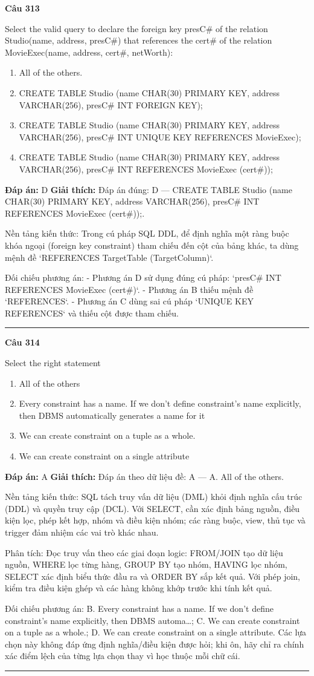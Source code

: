 \documentclass[11pt,a4paper]{article}
\newenvironment{question}[1]{%
  \par\vspace{1em}\noindent\textbf{\large Câu #1}\par\vspace{0.4em}
}{%
  \par\vspace{1em}\hrule\vspace{0.6em}
}
\newenvironment{choices}{%
  \begin{enumerate}[label=\textbf{\Alph*.},leftmargin=2.2em,itemsep=2pt,topsep=3pt]
}{%
  \end{enumerate}
}
\newcommand{\choice}{\item}
\begin{document}
\begin{question}{313}
Select the valid query to declare the foreign key presC# of the relation Studio(name, address, presC#) that references the cert# of the relation MovieExec(name, address, cert#, netWorth):
\begin{choices}
\choice All of the others.
\choice CREATE TABLE Studio (name CHAR(30) PRIMARY KEY, address VARCHAR(256), presC# INT FOREIGN KEY);
\choice CREATE TABLE Studio (name CHAR(30) PRIMARY KEY, address VARCHAR(256), presC# INT UNIQUE KEY REFERENCES MovieExec);
\choice CREATE TABLE Studio (name CHAR(30) PRIMARY KEY, address VARCHAR(256), presC# INT REFERENCES MovieExec (cert#));
\end{choices}
\textbf{Đáp án:} D
\textbf{Giải thích:} Đáp án đúng: D — CREATE TABLE Studio (name CHAR(30) PRIMARY KEY, address VARCHAR(256), presC# INT REFERENCES MovieExec (cert#));.

Nền tảng kiến thức: Trong cú pháp SQL DDL, để định nghĩa một ràng buộc khóa ngoại (foreign key constraint) tham chiếu đến cột của bảng khác, ta dùng mệnh đề `REFERENCES TargetTable (TargetColumn)`.

Đối chiếu phương án:
- Phương án D sử dụng đúng cú pháp: `presC# INT REFERENCES MovieExec (cert#)`.
- Phương án B thiếu mệnh đề `REFERENCES`.
- Phương án C dùng sai cú pháp `UNIQUE KEY REFERENCES` và thiếu cột được tham chiếu.
\end{question}

\begin{question}{314}
Select the right statement
\begin{choices}
\choice All of the others
\choice Every constraint has a name. If we don't define constraint's name explicitly, then DBMS automatically generates a name for it
\choice We can create constraint on a tuple as a whole.
\choice We can create constraint on a single attribute
\end{choices}
\textbf{Đáp án:} A
\textbf{Giải thích:} Đáp án theo dữ liệu đề: A — A. All of the others.

Nền tảng kiến thức: SQL tách truy vấn dữ liệu (DML) khỏi định nghĩa cấu trúc (DDL) và quyền truy cập (DCL). Với SELECT, cần xác định bảng nguồn, điều kiện lọc, phép kết hợp, nhóm và điều kiện nhóm; các ràng buộc, view, thủ tục và trigger đảm nhiệm các vai trò khác nhau.

Phân tích: Đọc truy vấn theo các giai đoạn logic: FROM/JOIN tạo dữ liệu nguồn, WHERE lọc từng hàng, GROUP BY tạo nhóm, HAVING lọc nhóm, SELECT xác định biểu thức đầu ra và ORDER BY sắp kết quả. Với phép join, kiểm tra điều kiện ghép và các hàng không khớp trước khi tính kết quả.

Đối chiếu phương án: B. Every constraint has a name. If we don't define constraint's name explicitly, then DBMS automa…; C. We can create constraint on a tuple as a whole.; D. We can create constraint on a single attribute. Các lựa chọn này không đáp ứng định nghĩa/điều kiện được hỏi; khi ôn, hãy chỉ ra chính xác điểm lệch của từng lựa chọn thay vì học thuộc mỗi chữ cái.
\end{question}
\end{document}

